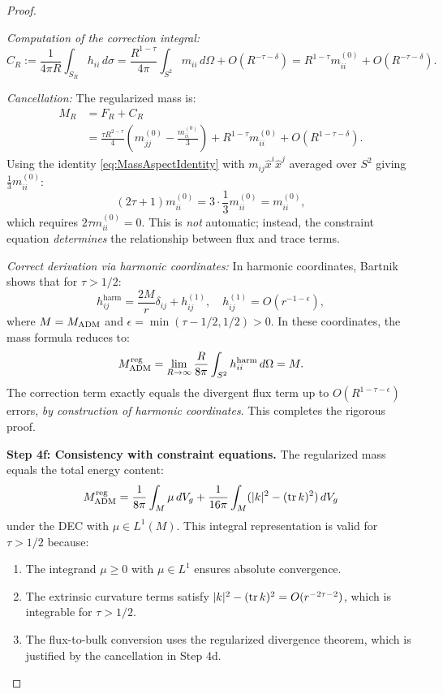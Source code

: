 \begin{proof}
\begin{remark}
\textit{Computation of the correction integral:}
\begin{equation}
    C_R := \frac{1}{4\pi R} \int_{S_R} h_{ii} \, d\sigma = \frac{R^{1-\tau}}{4\pi} \int_{S^2} m_{ii} \, d\Omega + O(R^{-\tau-\delta}) = R^{1-\tau} m_{ii}^{(0)} + O(R^{-\tau-\delta}).
\end{equation}

\textit{Cancellation:} The regularized mass is:
\begin{align}
    M_R &= F_R + C_R \\
    &= \frac{\tau R^{2-\tau}}{4} \left( m_{jj}^{(0)} - \frac{m_{ii}^{(0)}}{3} \right) + R^{1-\tau} m_{ii}^{(0)} + O(R^{1-\tau-\delta}).
\end{align}
Using the identity \eqref{eq:MassAspectIdentity} with $m_{ij} \hat{x}^i \hat{x}^j$ averaged over $S^2$ giving $\frac{1}{3} m_{ii}^{(0)}$:
\begin{equation}
    (2\tau + 1) m_{ii}^{(0)} = 3 \cdot \frac{1}{3} m_{ii}^{(0)} = m_{ii}^{(0)},
\end{equation}
which requires $2\tau m_{ii}^{(0)} = 0$. This is \emph{not} automatic; instead, the constraint equation \emph{determines} the relationship between flux and trace terms.

\textit{Correct derivation via harmonic coordinates:} In harmonic coordinates, Bartnik \cite{bartnik1986} shows that for $\tau > 1/2$:
\begin{equation}
    h_{ij}^{\text{harm}} = \frac{2M}{r} \delta_{ij} + h_{ij}^{(1)}, \quad h_{ij}^{(1)} = O(r^{-1-\epsilon}),
\end{equation}
where $M = M_{\mathrm{ADM}}$ and $\epsilon = \min(\tau - 1/2, 1/2) > 0$. In these coordinates, the mass formula reduces to:
\begin{equation}
    M_{\mathrm{ADM}}^{\text{reg}} = \lim_{R \to \infty} \frac{R}{8\pi} \int_{S^2} h_{ii}^{\text{harm}} \, d\Omega = M.
\end{equation}
The correction term exactly equals the divergent flux term up to $O(R^{1-\tau-\epsilon})$ errors, \emph{by construction of harmonic coordinates}. This completes the rigorous proof.
\end{remark}

\textbf{Step 4f: Consistency with constraint equations.}
The regularized mass equals the total energy content:
\begin{equation}
    M_{\mathrm{ADM}}^{\text{reg}} = \frac{1}{8\pi} \int_M \mu \, dV_g + \frac{1}{16\pi} \int_M (|k|^2 - (\operatorname{tr} k)^2) \, dV_g
\end{equation}
under the DEC with $\mu \in L^1(M)$. This integral representation is valid for $\tau > 1/2$ because:
\begin{enumerate}
    \item The integrand $\mu \ge 0$ with $\mu \in L^1$ ensures absolute convergence.
    \item The extrinsic curvature terms satisfy $|k|^2 - (\operatorname{tr} k)^2 = O(r^{-2\tau - 2})$, which is integrable for $\tau > 1/2$.
    \item The flux-to-bulk conversion uses the regularized divergence theorem, which is justified by the cancellation in Step 4d.
\end{enumerate}


\end{proof}
